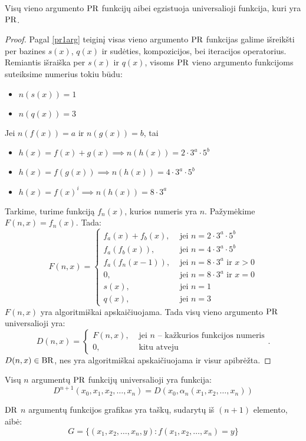 \begin{prop}
  Visų vieno argumento $\mathop{\text{PR}}$ funkcijų aibei egzistuoja universalioji
  funkcija, kuri yra $\mathop{\text{PR}}$.
  \begin{proof}
    Pagal \ref{pr1arg} teiginį visas vieno argumento $\mathop{\text{PR}}$ funkcijas
    galime išreikšti per bazines $s(x)$, $q(x)$ ir sudėties, kompozicijos,
    bei iteracijos operatorius.
    Remiantis išraiška per $s(x)$ ir $q(x)$, visoms $\mathop{\text{PR}}$ vieno argumento
    funkcijoms suteiksime numerius tokiu būdu:
    \begin{itemize}
      \item $n(s(x)) = 1$
      \item $n(q(x)) = 3$
    \end{itemize}
    Jei $n(f(x)) = a$ ir $n(g(x)) = b$, tai
    \begin{itemize}
      \item $h(x) = f(x) + g(x) \implies n(h(x)) = 2 \cdot 3^a \cdot 5^b$
      \item $h(x) = f(g(x)) \implies n(h(x)) = 4 \cdot 3^a \cdot 5^b$
      \item $h(x) = f(x)^{i} \implies n(h(x)) = 8 \cdot 3^a$
    \end{itemize}
    Tarkime, turime funkciją $f_{n}(x)$, kurios numeris yra $n$. 
    Pažymėkime $F(n,x) = f_{n}(x)$. Tada:
    \[
    F(n,x) =%
    \begin{cases}
      f_{a}(x) + f_{b}(x), & \text{ jei } n = 2\cdot3^a\cdot5^b \\
      f_{a}(f_{b}(x)), & \text{ jei } n = 4\cdot3^a\cdot5^b \\
      f_{a}(f_{n}(x-1)), & \text{ jei } n = 8\cdot3^a \text{ ir } x > 0 \\
      0, & \text{ jei } n = 8\cdot3^a \text{ ir } x = 0 \\
      s(x), & \text{ jei } n = 1 \\
      q(x), & \text{ jei } n = 3
    \end{cases}
    \]
    $F(n,x)$ yra algoritmiškai apskaičiuojama. Tada visų vieno argumento
    $\mathop{\text{PR}}$ universalioji yra:
    \[
    D(n,x) =%
    \begin{cases}
      F(n,x), & \text{ jei $n$ – kažkurios funkcijos numeris} \\
      0, & \text{ kitu atveju }
    \end{cases}.
    \]
    $D(n,x) \in \mathop{\text{BR}}$, nes yra algoritmiškai apskaičiuojama ir visur 
    apibrėžta.
  \end{proof}
\end{prop}

\begin{prop}
  Visų $n$ argumentų $\mathop{\text{PR}}$ funkcijų universalioji yra funkcija:
  \[
  D^{n+1}(x_0,x_1,x_2,\dotsc,x_n) = D(x_0,\alpha_n(x_1,x_2,\dotsc,x_n))
  \]
\end{prop}

\begin{defn}
  $\mathop{\text{DR}}$ $n$ argumentų funkcijos grafikas yra taškų, sudarytų iš 
  $(n+1)$ elemento, aibė:
  \[
  G = \{ (x_1,x_2,\dotsc,x_n,y): f(x_1,x_2,\dotsc,x_n) = y \}
  \]
\end{defn}


